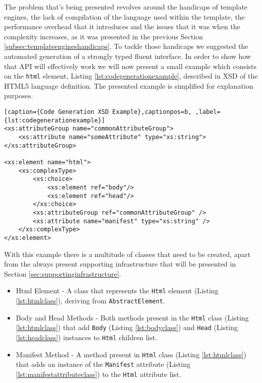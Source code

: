 The problem that's being presented revolves around the handicaps of template engines, the lack of compilation of the language used within the template, the performance overhead that it introduces and the issues that it was when the complexity increases, as it was presented in the previous Section \ref{subsec:templateengineshandicaps}. To tackle those handicaps we suggested the automated generation of a strongly typed fluent interface. In order to show how that \ac{API} will effectively work we will now present a small example which consists on the \texttt{html} element, Listing \ref{lst:codegenerationexample}, described in \ac{XSD} of the \ac{HTML}5 language definition. The presented example is simplified for explanation purposes.

\bigskip


\begin{minipage}{\linewidth}
\begin{lstlisting}[caption={Code Generation XSD Example},captionpos=b, ,label={lst:codegenerationexample}]
<xs:attributeGroup name="commonAttributeGroup">
    <xs:attribute name="someAttribute" type="xs:string">
</xs:attributeGroup>

<xs:element name="html">
    <xs:complexType>
        <xs:choice>
            <xs:element ref="body"/>
            <xs:element ref="head"/>
        </xs:choice>
        <xs:attributeGroup ref="commonAttributeGroup" />
        <xs:attribute name="manifest" type="xs:string" />
    </xs:complexType>
</xs:element>
\end{lstlisting}
\end{minipage}

\noindent
With this example there is a multitude of classes that need to be created, apart from the always present supporting infrastructure that will be presented in Section \ref{sec:supportinginfrastructure}. 

\begin{itemize}
	\item Html Element - A class that represents the \texttt{Html} element (Listing \ref{lst:htmlclass}), deriving from \texttt{AbstractElement}.
	\item Body and Head Methods - Both methods present in the \texttt{Html} class (Listing \ref{lst:htmlclass}) that add \texttt{Body} (Listing \ref{lst:bodyclass}) and \texttt{Head} (Listing \ref{lst:headclass}) instances to \texttt{Html} children list.
	\item Manifest Method - A method present in \texttt{Html} class (Listing \ref{lst:htmlclass}) that adds an instance of the \texttt{Manifest} attribute (Listing \ref{lst:manifestattributeclass}) to the \texttt{Html} attribute list.
\end{itemize}

